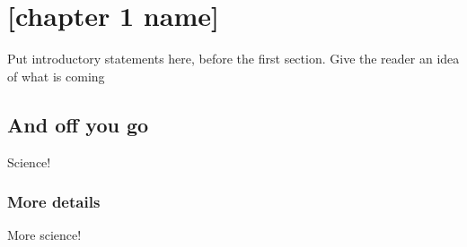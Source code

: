 \chapter{[chapter 1 name]} \label{ch:[chapter 1 label]}

Put introductory statements here, before the first section.
Give the reader an idea of what is coming

\section{And off you go}

Science!

\subsection{More details}

More science!